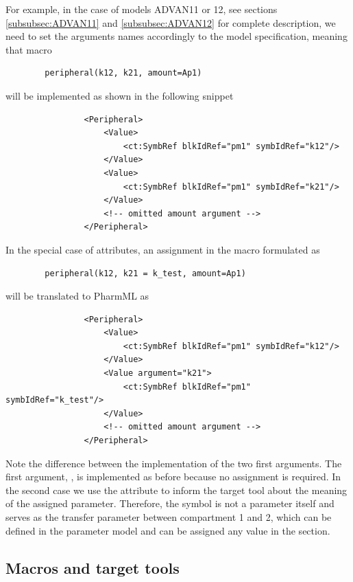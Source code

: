 For example, in the case of models ADVAN11 or 12, see sections \ref{subsubsec:ADVAN11} and 
\ref{subsubsec:ADVAN12} for complete description, we need to set the  arguments names accordingly to the model
specification, meaning that macro 
\lstset{language=NONMEMdataSet}
\begin{lstlisting}
		peripheral(k12, k21, amount=Ap1)
\end{lstlisting}
will be implemented as shown in the following snippet
\lstset{language=XML}
\begin{lstlisting}
                <Peripheral>
                    <Value>
                        <ct:SymbRef blkIdRef="pm1" symbIdRef="k12"/>
                    </Value>
                    <Value>
                        <ct:SymbRef blkIdRef="pm1" symbIdRef="k21"/>
                    </Value>
                    <!-- omitted amount argument -->
                </Peripheral>
\end{lstlisting}

In the special case of  attributes, an assignment in the macro 
formulated as
\lstset{language=NONMEMdataSet}
\begin{lstlisting}
		peripheral(k12, k21 = k_test, amount=Ap1)
\end{lstlisting}
will be translated to PharmML as
\lstset{language=XML}
\begin{lstlisting}
                <Peripheral>
                    <Value>
                        <ct:SymbRef blkIdRef="pm1" symbIdRef="k12"/>
                    </Value>
                    <Value argument="k21">
                        <ct:SymbRef blkIdRef="pm1" symbIdRef="k_test"/>
                    </Value>
                    <!-- omitted amount argument -->
                </Peripheral>
\end{lstlisting}
Note the difference between the implementation of the two first arguments. 
The first argument, , is implemented as before because no assignment
is required. In the second case we use the  attribute to inform 
the target tool about the meaning of the assigned parameter. Therefore, the 
symbol  is not a parameter itself and  serves as the 
transfer parameter  between compartment 1 and 2, which can be defined 
in the parameter model  and can be assigned any value in the 
 section.


\subsection{Macros and target tools}
\label{subsec:LinkingMacrosDatasets}

